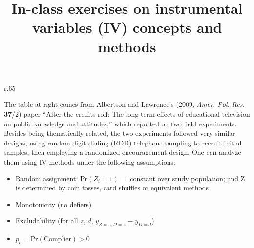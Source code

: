 \documentclass{article}
\title{In-class exercises on instrumental variables (IV) concepts and methods }
\begin{document}
\maketitle

\begin{minipage}{1.0\linewidth}

\begin{wrapfigure}{r}{.65\linewidth}
\end{wrapfigure}

The table at right comes from Albertson and Lawrence's (2009, \textit{Amer. Pol. Res.} \textbf{37}/2) paper ``After the credits roll: The long term effects of educational television on public knowledge and attitudes,'' which reported on two field experiments.   Besides being thematically related, the two experiments followed very similar designs, using random digit dialing (RDD) telephone sampling to recruit initial samples, then employing a randomized encouragement design.  One can analyze them using IV methods under the following assumptions:

\begin{itemize}
\item Random assignment: $\mathrm{Pr}(Z_{i}=1) = $ constant over study population;  and $\mathrm{Z} $ is determined by coin tosses, card shuffles or equivalent methods
\item Monotonicity (no defiers)
\item Excludability (for all $z$, $d$, $y_{Z=z, D=z} \equiv y_{D=d}$)
\item $p_{c} = \mathrm{Pr}(\mathrm{Complier}) > 0$ 
\end{itemize}
  
\end{minipage}
\vspace{4ex}
\end{document}
